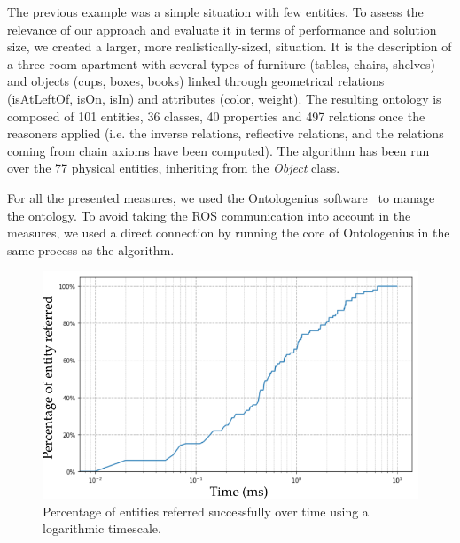 The previous example was a simple situation with few entities. To assess the relevance of our approach and evaluate it in terms of performance and solution size, we created a larger, more realistically-sized, situation. It is the description of a three-room apartment with several types of furniture (tables, chairs, shelves) and objects (cups, boxes, books) linked through geometrical relations (isAtLeftOf, isOn, isIn) and attributes (color, weight). The resulting ontology is composed of 101 entities, 36 classes, 40 properties and 497 relations once the reasoners applied (i.e. the inverse relations, reflective relations, and the relations coming from chain axioms have been computed). The algorithm has been run over the 77 physical entities, inheriting from the \textit{Object} class.

For all the presented measures, we used the Ontologenius software~\cite{sarthou_2019_ontologenius} to manage the ontology. To avoid taking the ROS communication into account in the measures, we used a direct connection by running the core of Ontologenius in the same process as the algorithm.

\begin{figure}[ht!]
\centering
\includegraphics[scale=0.55]{figures/chapter4/scaling_up_percentage.png}
\caption{\label{fig:chap4_percentage} Percentage of entities referred successfully over time using a logarithmic timescale. }
\end{figure}

